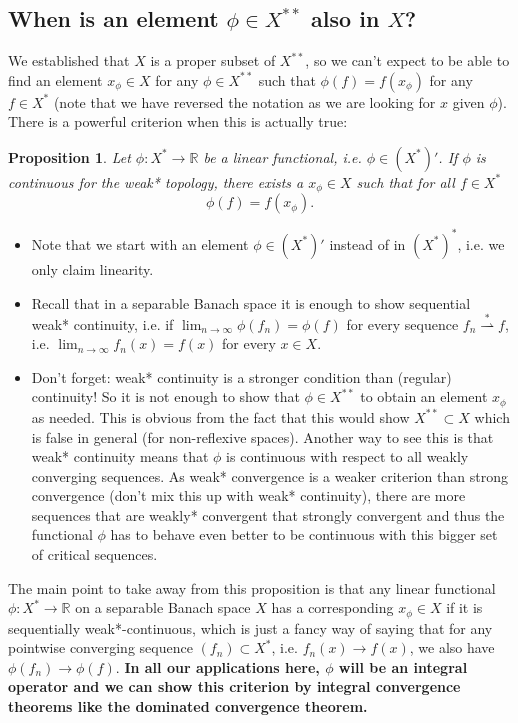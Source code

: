 \documentclass{scrartcl}
\newtheorem{prop}{Proposition}
\theoremstyle{definition}
\theoremstyle{remark}
\newcommand{\R}{\mathbb R}
\begin{document}
{\subsection*{When is an element $\phi\in X^{**}$ also in $X$?}
We established that $X$ is a proper subset of $X^{**}$, so we can't expect to be able to find an element $x_\phi\in X$ for any $\phi \in X^{**}$ such that $\phi(f) = f(x_\phi)$ for any $f\in X^*$ (note that we have reversed the notation as we are looking for $x$ given $\phi$). There is a powerful criterion when this is actually true:
\begin{prop}\label{prop:weakstar}
Let $\phi : X^*\to \R$ be a linear functional, i.e. $\phi\in (X^*)'$. If $\phi$ is continuous for the weak* topology, there exists a $x_\phi\in X$ such that for all $f\in X^*$
\[\phi(f) = f(x_\phi).\]
\end{prop}
\begin{itemize}
\item Note that we start with an element $\phi \in (X^*)'$ instead of in $(X^*)^*$, i.e. we only claim linearity.
\item Recall that in a separable Banach space it is enough to show sequential weak* continuity, i.e. if $\lim_{n\to \infty}\phi(f_n) = \phi(f)$ for every sequence $f_n \stackrel {*}{\rightharpoonup} f$, i.e. $\lim_{n\to\infty} f_n(x) = f(x)$ for every $x\in X$.
\item Don't forget: weak* continuity is a stronger condition than (regular) continuity! So it is not enough to show that $\phi\in X^{**}$ to obtain an element $x_\phi$ as needed. This is obvious from the fact that this would show $X^{**} \subset X$ which is false in general (for non-reflexive spaces). Another way to see this is that weak* continuity means that $\phi$ is continuous with respect to all weakly converging sequences. As weak* convergence is a weaker criterion than strong convergence (don't mix this up with weak* continuity), there are more sequences that are weakly* convergent that strongly convergent and thus the functional $\phi$ has to behave even better to be continuous with this bigger set of critical sequences.
\end{itemize}
The main point to take away from this proposition is that any linear functional $\phi : X^{*}\to \R$ on a separable Banach space $X$ has a corresponding $x_\phi\in X$ if it is sequentially weak*-continuous, which is just a fancy way of saying that for any pointwise converging sequence $(f_n)\subset X^*$, i.e. $f_n(x) \to f(x)$, we also have $\phi(f_n) \to \phi(f)$. \textbf{In all our applications here, $\phi$ will be an integral operator and we can show this criterion by integral convergence theorems like the dominated convergence theorem.}  
}
\end{document}
